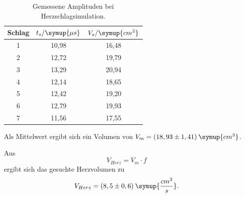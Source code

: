 \begin{table}[H]
  \centering
  \caption{Gemessene Amplituden bei Herzschlagsimulation.}
  \label{tab:1}
  \begin{tabular}{c c c }
    \toprule
  Schlag & $t_s/\symup{\mu s}$ & $V_s/\symup{cm^3}$ \\
    \midrule
    1  &  10,98 & 16,48     \\
    2  &  12,72 & 19,79     \\
    3  &  13,29 & 20,94     \\
    4  &  12,14 & 18,65     \\
    5  &  12,42 & 19,20     \\
    6  &  12,79 & 19,93     \\
    7  &  11,56 & 17,55     \\
    \bottomrule
  \end{tabular}
\end{table}

\noindent Als Mittelwert ergibt sich ein Volumen von $V_{m} = (18,93 \pm 1,41) \: \symup{cm^3}$.

\noindent Aus
\begin{equation*}
  V_{Herz} = V_m \cdot f
\end{equation*}
ergibt sich das gesuchte Herzvolumen zu
\begin{equation*}
  V_{Herz} = (8,5 \pm 0,6) \: \symup{\frac{cm^3}{s}}.
\end{equation*}
\vspace*{20mm}